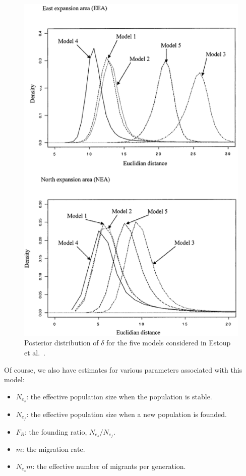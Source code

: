 \documentclass[12pt]{article}
\begin{document}
\begin{figure}
\begin{center}
\includegraphics[width=4.5in]{cane-toad-models.eps}
\end{center}
\caption{Posterior distribution of $\delta$ for the five models
  considered in Estoup et al.~\cite{Estoup-etal-2004}.}\label{fig:cane-toad-models}
\end{figure}

Of course, we also have estimates for various parameters associated
with this model: 

\begin{itemize}

\item $N_{e_s}$: the effective population size when the population is
  stable.

\item $N_{e_f}$: the effective population size when a new population
  is founded.

\item $F_R$: the founding ratio, $N_{e_s}/N_{e_f}$.

\item $m$: the migration rate.

\item $N_{e_s}m$: the effective number of migrants per generation.

\end{itemize}
\end{document}
